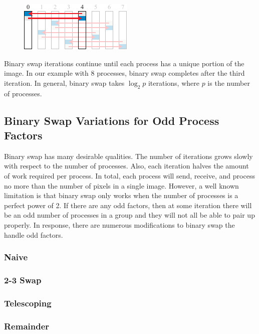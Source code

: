 \documentclass{vgtc}                          %
\begin{document}
\begin{figure}
  \includegraphics[scale=.75]{binary-swap-3}
\end{figure}
Binary swap iterations continue until each process has a unique portion of the image.
In our example with 8 processes, binary swap completes after the third iteration.
In general, binary swap takes $\log_{2}p$ iterations, where $p$ is the number of processes.

\subsection{Binary Swap Variations for Odd Process Factors}
\label{sec:BinarySwapVariations}

Binary swap has many desirable qualities.
The number of iterations grows slowly with respect to the number of processes.
Also, each iteration halves the amount of work required per process.
In total, each process will send, receive, and process no more than the number of pixels in a single image.
However, a well known limitation is that binary swap only works when the number of processes is a perfect power of 2.
If there are any odd factors, then at some iteration there will be an odd number of processes in a group and they will not all be able to pair up properly.
In response, there are numerous modifications to binary swap the handle odd factors.

\subsubsection{Naive}

\subsubsection{2-3 Swap}

\subsubsection{Telescoping}

\subsubsection{Remainder}
\end{document}
